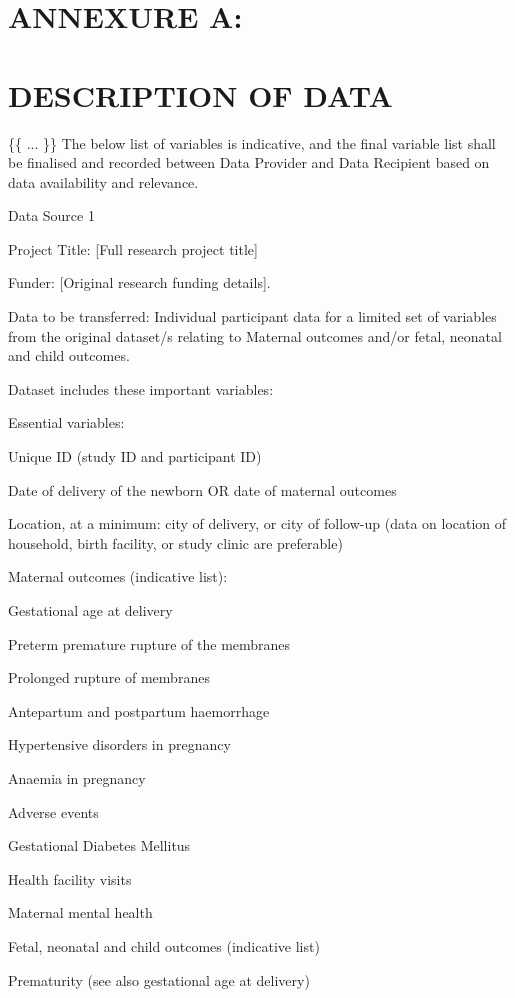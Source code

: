 \documentclass[12pt,letterpaper]{article}
\begin{document}
\section*{ANNEXURE A:}

\section*{DESCRIPTION OF DATA}

\{\{ ... \}\} The below list of variables is indicative, and the final variable list shall be finalised and recorded between Data Provider and Data Recipient based on data availability and relevance.

Data Source 1

Project Title: [Full research project title]

Funder: [Original research funding details].

Data to be transferred: Individual participant data for a limited set of variables from the original dataset/s relating to Maternal outcomes and/or fetal, neonatal and child outcomes.

Dataset includes these important variables:

Essential variables:

Unique ID (study ID and participant ID)

Date of delivery of the newborn OR date of maternal outcomes

Location, at a minimum: city of delivery, or city of follow-up (data on location of household, birth facility, or study clinic are preferable)

Maternal outcomes (indicative list):

Gestational age at delivery

Preterm premature rupture of the membranes

Prolonged rupture of membranes

Antepartum and postpartum haemorrhage

Hypertensive disorders in pregnancy

Anaemia in pregnancy

Adverse events

Gestational Diabetes Mellitus

Health facility visits

Maternal mental health

Fetal, neonatal and child outcomes (indicative list)

Prematurity (see also gestational age at delivery)
\end{document}
